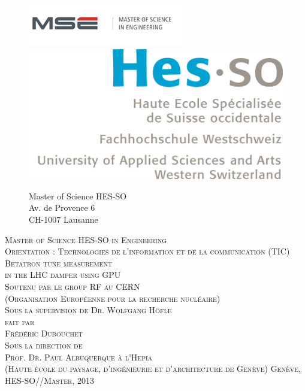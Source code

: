 
\begin{titlepage}

\begin{figure}[H]
\includegraphics[scale=1.0]{MSE.PNG}
\hfill
\includegraphics[scale=0.1]{HESSO.jpg} \\
\begin{flushleft} \small
Master of Science HES-SO\\
Av. de Provence 6\\
CH-1007 Lausanne\\[2cm]
\end{flushleft}
\end{figure} 


\begin{flushright}
\textsc{\Large Master of Science HES-SO in Engineering} \\[0.2cm]
\textsc{\small Orientation : Technologies de l’information et de la communication (TIC)}\\[1cm]
\textsc{\LARGE Betatron tune measurement \\[0.3cm] in the LHC damper using GPU} \\ [1cm]
\textsc{\small Soutenu par le group RF au CERN}\\ 
\textsc{\small (Organisation Europ{\'e}enne pour la recherche nucl{\'e}aire)}\\
\textsc{\small Sous la supervision de Dr. Wolfgang H{\"o}f\/le} \\[2cm]
\textsc{\small fait par} \\
\textsc{\Large Fr{\'e}d{\'e}ric Dubouchet} \\[2cm]
\textsc{\small Sous la direction de}\\
\textsc{\small Prof. Dr. Paul Albuquerque}
\textsc{\small {\`a} l'Hepia}\\
\textsc{\small (Haute {\'e}cole du paysage, d'ing{\'e}nieurie et d'architecture de Gen{\`e}ve)}
\vfill
\textsc{\small Gen{\`e}ve, HES-SO//Master, 2013}

\end{flushright}

\end{titlepage}